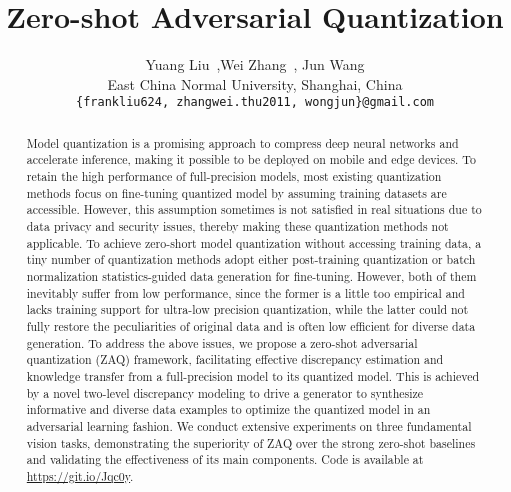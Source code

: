 \documentclass[final]{cvpr}
\begin{document}
\title{Zero-shot Adversarial Quantization}

\renewcommand{\thefootnote}{\fnsymbol{footnote}}
\author {
  Yuang Liu~,\quad Wei Zhang\footnotemark[1]~, \quad Jun Wang\footnotemark[1] \\
  East China Normal University, Shanghai, China \\
{\tt\small \{frankliu624, zhangwei.thu2011, wongjun\}@gmail.com}
}

\maketitle

\renewcommand{\thefootnote}{\arabic{footnote}}



\begin{abstract}
Model quantization is a promising approach to compress deep neural networks and accelerate inference, making it possible to be deployed on mobile and edge devices. To retain the high performance of full-precision models, most existing quantization methods focus on fine-tuning quantized model by assuming training datasets are accessible. 
However, this assumption sometimes is not satisfied in real situations due to data privacy and security issues, thereby making these quantization methods not applicable.
To achieve zero-short model quantization without accessing training data, a tiny number of quantization methods adopt either post-training quantization or batch normalization statistics-guided data generation for fine-tuning.
However, both of them inevitably suffer from low performance, since the former is a little too empirical and lacks training support for ultra-low precision quantization, while the latter could not fully restore the peculiarities of original data and is often low efficient for diverse data generation.
To address the above issues, we propose a zero-shot adversarial quantization (ZAQ) framework, facilitating effective discrepancy estimation and knowledge transfer from a full-precision model to its quantized model.
This is achieved by a novel two-level discrepancy modeling to drive a generator to synthesize informative and diverse data examples to optimize the quantized model in an adversarial learning fashion.
We conduct extensive experiments on three fundamental vision tasks, demonstrating the superiority of ZAQ over the strong zero-shot baselines and validating the effectiveness of its main components.
Code is available at \href{https://git.io/Jqc0y}{https://git.io/Jqc0y}.

\end{abstract}
\end{document}
